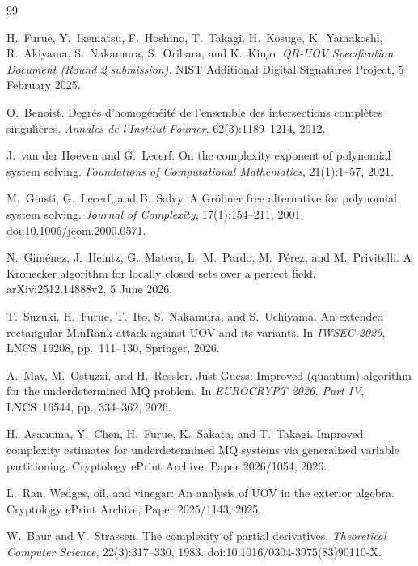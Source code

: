 \documentclass[11pt,a4paper]{article}
\theoremstyle{definition}
\theoremstyle{remark}
\begin{document}
\begin{thebibliography}{99}
\fontsize{7.5pt}{8.2pt}\selectfont
\setlength{\itemsep}{0pt}
\setlength{\parsep}{0pt}

H.~Furue, Y.~Ikematsu, F.~Hoshino, T.~Takagi, H.~Kosuge, K.~Yamakoshi, R.~Akiyama, S.~Nakamura, S.~Orihara, and K.~Kinjo.
\newblock \emph{QR-UOV Specification Document (Round 2 submission)}.
\newblock NIST Additional Digital Signatures Project, 5 February 2025.

O.~Benoist.
\newblock Degr\'es d'homog\'en\'eit\'e de l'ensemble des intersections compl\`etes singuli\`eres.
\newblock \emph{Annales de l'Institut Fourier}, 62(3):1189--1214, 2012.

J.~van der Hoeven and G.~Lecerf.
\newblock On the complexity exponent of polynomial system solving.
\newblock \emph{Foundations of Computational Mathematics}, 21(1):1--57, 2021.

M.~Giusti, G.~Lecerf, and B.~Salvy.
\newblock A Gr\"obner free alternative for polynomial system solving.
\newblock \emph{Journal of Complexity}, 17(1):154--211, 2001.
\newblock doi:10.1006/jcom.2000.0571.

N.~Gim\'enez, J.~Heintz, G.~Matera, L.~M.~Pardo, M.~P\'erez, and M.~Privitelli.
\newblock A Kronecker algorithm for locally closed sets over a perfect field.
\newblock arXiv:2512.14888v2, 5 June 2026.

T.~Suzuki, H.~Furue, T.~Ito, S.~Nakamura, and S.~Uchiyama.
\newblock An extended rectangular MinRank attack against UOV and its variants.
\newblock In \emph{IWSEC 2025}, LNCS~16208, pp.~111--130, Springer, 2026.

A.~May, M.~Ostuzzi, and H.~Ressler.
\newblock Just Guess: Improved (quantum) algorithm for the underdetermined MQ problem.
\newblock In \emph{EUROCRYPT 2026, Part IV}, LNCS~16544, pp.~334--362, 2026.

H.~Asanuma, Y.~Chen, H.~Furue, K.~Sakata, and T.~Takagi.
\newblock Improved complexity estimates for underdetermined MQ systems via generalized variable partitioning.
\newblock Cryptology ePrint Archive, Paper 2026/1054, 2026.

L.~Ran.
\newblock Wedges, oil, and vinegar: An analysis of UOV in the exterior algebra.
\newblock Cryptology ePrint Archive, Paper 2025/1143, 2025.

W.~Baur and V.~Strassen.
\newblock The complexity of partial derivatives.
\newblock \emph{Theoretical Computer Science}, 22(3):317--330, 1983.
\newblock doi:10.1016/0304-3975(83)90110-X.


\end{thebibliography}
\end{document}
